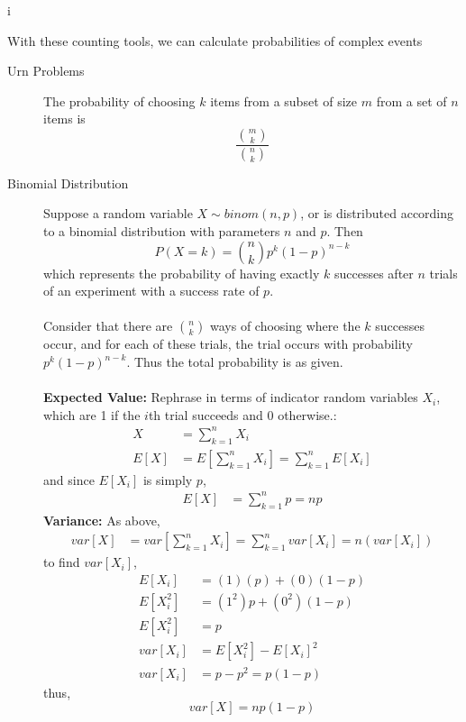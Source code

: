 i\documentclass[10pt]{article}
\begin{document}
\par
With these counting tools, we can calculate probabilities of complex events



\begin{description}
    \item[Urn Problems] The probability of choosing  $k$ items from a subset of size $m$ 
        from a set of $n$ items is
        \[ \frac{\binom{m}{k}}{\binom{n}{k}} \]
\end{description}

\begin{description}
    \item[Binomial Distribution] 
        Suppose a random variable $X \sim binom(n, p)$, or is distributed according to a binomial distribution 
        with parameters $n$ and $p$. Then 
        \[ P(X = k) = \binom{n}{k}p^k(1-p)^{n-k} \]
        which represents the probability of having exactly $k$ successes after $n$ trials of an experiment 
        with a success rate of $p$. \\\\
        Consider that there are $\binom{n}{k}$ ways of choosing where the $k$ successes occur, and for each
        of these trials, the trial occurs with probability $p^k(1-p)^{n-k}$. Thus the total probability is
        as given. \\\\

        \textbf{Expected Value:} 
            Rephrase in terms of indicator random variables $X_i$, which are 1 if the $i$th trial succeeds and
            0 otherwise.:
            \begin{align*}
                X &= \sum_{k = 1}^n X_i \\
                E[X] &= E\left[\sum_{k=1}^n X_i\right] = \sum_{k=1}^n E[X_i] 
            \end{align*}
            and since $E[X_i]$ is simply $p$,
            \begin{align*}
                E[X] &= \sum_{k=1}^n p = np 
            \end{align*}
        \textbf{Variance:}
            As above,
            \begin{align*}
                var[X] &= var\left[\sum_{k=1}^n X_i\right] = \sum_{k=1}^n var[X_i] = n(var[X_i])
            \end{align*}
            to find $var[X_i]$,
            \begin{align*}
                E[X_i] &= (1)(p) + (0)(1-p) \\
                E[X_i^2] &= (1^2)p + (0^2)(1-p) \\
                E[X_i^2] &= p \\
                var[X_i] &= E[X_i^2] - E[X_i]^2 \\
                var[X_i] &= p - p^2 = p(1-p)
            \end{align*}
            thus,
            \[ var[X] = np(1-p) \]

\end{description}
\end{document}
